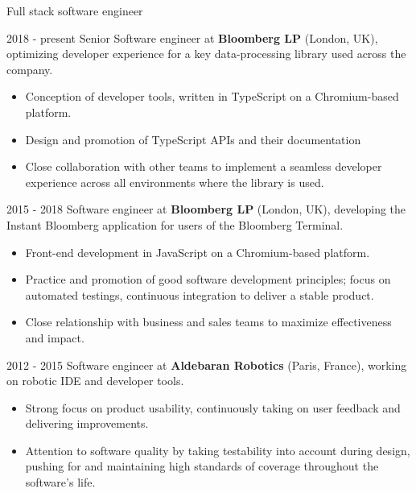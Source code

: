 \documentclass{article}
\newcommand{\cvitem}[1]{
\raggedright{
\vskip 3mm
\makebox[\textwidth]{\rule{11mm}{0.4pt} \hskip 2mm {\Large\bf\sc #1} \hskip 2mm \leaders \hrule \hfill}
}
}
\begin{document}
\begin{cv}{Full stack software engineer}

\vskip 3mm

\cvitem{Work experience}
    \begin{cvlist}{}
    \item[2018 - present] Senior Software engineer at \textbf{Bloomberg LP}
      (London, UK), optimizing developer experience for a key data-processing library used across the company.

      \begin{itemize}
      \item Conception of developer tools, written in TypeScript on a Chromium-based platform.
      \item Design and promotion of TypeScript APIs and their documentation
      \item Close collaboration with other teams to implement a seamless developer experience across all environments where the library is used.
      \end{itemize}

    \item[2015 - 2018] Software engineer at \textbf{Bloomberg LP} (London, UK),
      developing the Instant Bloomberg application for users of the Bloomberg
      Terminal.

      \begin{itemize}
      \item Front-end development in JavaScript on a Chromium-based platform.

      \item Practice and promotion of good software development principles; focus on
      automated testings, continuous integration to deliver a stable product.

      \item Close relationship with business and sales teams to maximize effectiveness and impact.
      \end{itemize}

    \item[2012 - 2015] Software engineer at \textbf{Aldebaran Robotics}
      (Paris, France), working on robotic IDE and developer tools.

      \begin{itemize}
      \item Strong focus on product usability, continuously taking on user
      feedback and delivering improvements.

      \item Attention to software quality by taking testability into account during
      design, pushing for and maintaining high standards of coverage throughout
      the software's life.
      \end{itemize}


\end{cvlist}
\end{cv}
\end{document}
